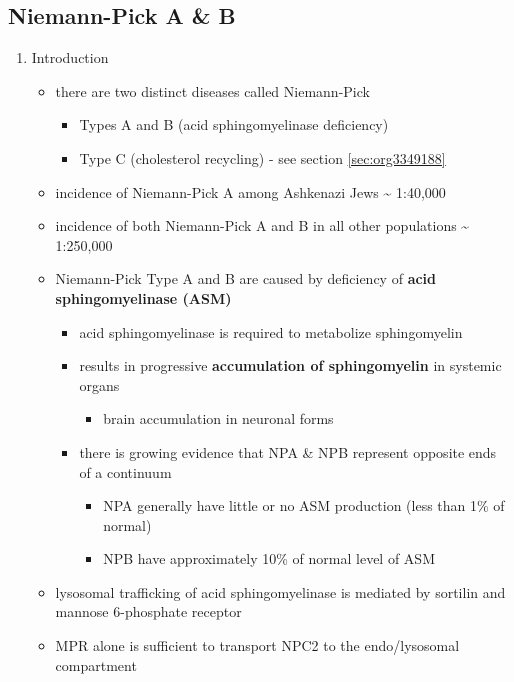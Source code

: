 \documentclass{scrartcl}
\begin{document}
\subsection{Niemann-Pick  A \& B}
\label{sec:org4bceca9}
\begin{enumerate}
\item Introduction
\label{sec:orgfb63791}
\begin{itemize}
\item there are two distinct diseases called Niemann-Pick
\begin{itemize}
\item Types A and B (acid sphingomyelinase deficiency)
\item Type C (cholesterol recycling) - see section \ref{sec:org3349188}
\end{itemize}

\item incidence of Niemann-Pick A among Ashkenazi Jews \textasciitilde{} 1:40,000
\item incidence of both Niemann-Pick A and B in all other populations \textasciitilde{} 1:250,000
\item Niemann-Pick Type A and B are caused by deficiency of \textbf{acid sphingomyelinase (ASM)}
\begin{itemize}
\item acid sphingomyelinase is required to metabolize sphingomyelin
\item results in progressive \textbf{accumulation of sphingomyelin} in systemic organs
\begin{itemize}
\item brain accumulation in neuronal forms
\end{itemize}
\item there is growing evidence that NPA \& NPB represent opposite ends of a continuum
\begin{itemize}
\item NPA generally have little or no ASM production (less than 1\% of normal)
\item NPB have approximately 10\% of normal level of ASM
\end{itemize}
\end{itemize}
\item lysosomal trafficking of acid sphingomyelinase is mediated by sortilin and mannose 6-phosphate receptor
\item MPR alone is sufficient to transport NPC2 to the endo/lysosomal compartment
\end{itemize}



\end{enumerate}
\end{document}
